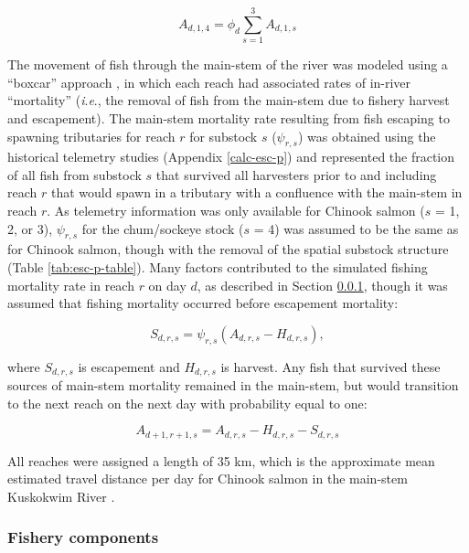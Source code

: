 \documentclass[12pt,]{book}
\theoremstyle{definition}
\theoremstyle{definition}
\theoremstyle{definition}
\theoremstyle{remark}
\begin{document}
\begin{equation}
  A_{d,1,4}=\phi_d \sum_{s=1}^3 A_{d,1,s}
  \label{eq:get-chsk-entry}
\end{equation}

The movement of fish through the main-stem of the river was modeled
using a ``boxcar'' approach \citep{walters-martell-2004}, in which each
reach had associated rates of in-river ``mortality''
(\emph{i}.\emph{e}., the removal of fish from the main-stem due to
fishery harvest and escapement). The main-stem mortality rate resulting
from fish escaping to spawning tributaries for reach \(r\) for substock
\(s\) (\(\psi_{r,s}\)) was obtained using the historical telemetry
studies (Appendix \ref{calc-esc-p}) and represented the fraction of all
fish from substock \(s\) that survived all harvesters prior to and
including reach \(r\) that would spawn in a tributary with a confluence
with the main-stem in reach \(r\). As telemetry information was only
available for Chinook salmon (\(s\) = 1, 2, or 3), \(\psi_{r,s}\) for
the chum/sockeye stock (\(s\) = 4) was assumed to be the same as for
Chinook salmon, though with the removal of the spatial substock
structure (Table \ref{tab:esc-p-table}). Many factors contributed to the
simulated fishing mortality rate in reach \(r\) on day \(d\), as
described in Section \ref{om-fishery}, though it was assumed that
fishing mortality occurred before escapement mortality:

\begin{equation}
  S_{d,r,s}=\psi_{r,s} \left(A_{d,r,s} - H_{d,r,s} \right),
  \label{eq:get-esc}
\end{equation}

\noindent
where \(S_{d,r,s}\) is escapement and \(H_{d,r,s}\) is harvest. Any fish
that survived these sources of main-stem mortality remained in the
main-stem, but would transition to the next reach on the next day with
probability equal to one:

\begin{equation}
  A_{d+1,r+1,s}=A_{d,r,s}-H_{d,r,s}-S_{d,r,s}
  \label{eq:move-fish}
\end{equation}

\noindent
All reaches were assigned a length of 35 km, which is the approximate
mean estimated travel distance per day for Chinook salmon in the
main-stem Kuskokwim River
\citep{smith-liller-2017a, smith-liller-2017b}.

\subsubsection{Fishery components}\label{om-fishery}
\end{document}
